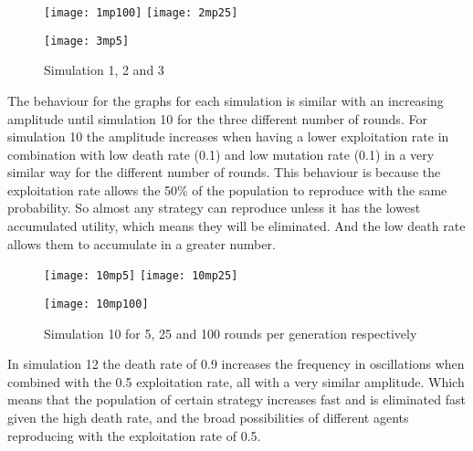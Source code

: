 \documentclass{book}
\begin{document}
\begin{figure}[H]       
    \begin{center}
    \mbox{\texttt{[image: 1mp100]}}   
    \hspace{0px}
    \mbox{\texttt{[image: 2mp25]}}
    \hspace{40px}
    \end{center}
    \begin{center}
    \mbox{\texttt{[image: 3mp5]}}
    \end{center}
    \caption{Simulation 1, 2 and 3}
    \label{firstthreesimulations}
\end{figure}

The behaviour for the graphs for each simulation is similar with an increasing amplitude until simulation 10 for the three different number of rounds. For simulation 10 the amplitude increases when having a lower exploitation rate in combination with low death rate (0.1) and low mutation rate (0.1) in a very similar way for the different number of rounds. This behaviour is because the exploitation rate allows the 50\% of the population to reproduce with the same probability. So almost any strategy can reproduce unless it has the lowest accumulated utility, which means they will be eliminated. And the low death rate allows them to accumulate in a greater number.

\begin{figure}[H]       
    \begin{center}
    \mbox{\texttt{[image: 10mp5]}}   
    \hspace{0px}
    \mbox{\texttt{[image: 10mp25]}}
    \hspace{40px}
    \end{center}
    \begin{center}
    \mbox{\texttt{[image: 10mp100]}}
    \end{center}
    \caption{Simulation 10 for 5, 25 and 100 rounds per generation respectively}
    \label{simulation10mp}
\end{figure}

In simulation 12  the death rate of 0.9 increases the frequency in oscillations when combined with the 0.5 exploitation rate, all with a very similar amplitude. Which means that the population of certain strategy increases fast and is eliminated fast given the high death rate, and the broad possibilities of different agents reproducing with the exploitation rate of 0.5.
\end{document}
